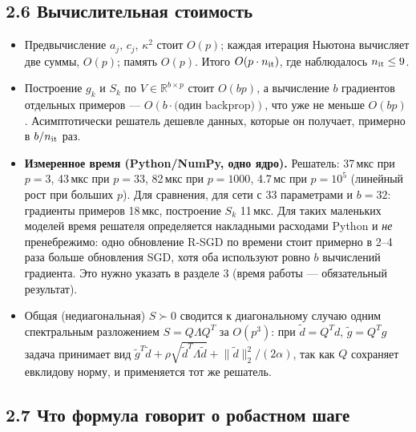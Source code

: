 \documentclass[11pt,a4paper]{article}
\newcommand{\norm}[1]{\lVert #1\rVert_2}
\begin{document}
\subsection*{2.6 Вычислительная стоимость}

\begin{itemize}
\item Предвычисление $a_j$, $c_j$, $\kappa^2$ стоит $O(p)$; каждая итерация Ньютона
вычисляет две суммы, $O(p)$; память $O(p)$. Итого $O(p\cdot n_{\rm it})$, где
наблюдалось $n_{\rm it}\le9$.
\item Построение $g_k$ и $S_k$ по $V\in\mathbb R^{b\times p}$ стоит $O(bp)$, а
вычисление $b$ градиентов отдельных примеров — $O(b\cdot\text{(один backprop)})$, что
уже не меньше $O(bp)$. Асимптотически решатель дешевле данных, которые он получает,
примерно в $b/n_{\rm it}$ раз.
\item \textbf{Измеренное время (Python/NumPy, одно ядро).} Решатель: 37\,мкс при
$p=3$, 43\,мкс при $p=33$, 82\,мкс при $p=1000$, 4.7\,мс при $p=10^5$ (линейный рост
при больших $p$). Для сравнения, для сети с 33 параметрами и $b=32$: градиенты примеров
18\,мкс, построение $S_k$ 11\,мкс. Для таких маленьких моделей время решателя
определяется накладными расходами Python и \emph{не} пренебрежимо: одно обновление
R-SGD по времени стоит примерно в 2--4 раза больше обновления SGD, хотя оба используют
ровно $b$ вычислений градиента. Это нужно указать в разделе 3 (время работы — обязательный
результат).
\item Общая (недиагональная) $S\succ0$ сводится к диагональному случаю одним
спектральным разложением $S=Q\Lambda Q^T$ за $O(p^3)$: при $\tilde d=Q^Td$,
$\tilde g=Q^Tg$ задача принимает вид
$\tilde g^T\tilde d+\rho\sqrt{\tilde d^T\Lambda\tilde d}+\norm{\tilde d}^2/(2\alpha)$,
так как $Q$ сохраняет евклидову норму, и применяется тот же решатель.
\end{itemize}

\subsection*{2.7 Что формула говорит о робастном шаге}
\end{document}
